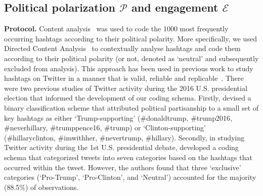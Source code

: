 \subsection{Political polarization $\mathcal{P}$ and engagement $\mathcal{E}$}
\label{subsec:political-polarization-measures}




\textbf{Protocol.}
Content analysis~\cite{kimkuljis2010} was used to code the 1000 most frequently occurring hashtags according to their political polarity. More specifically, we used 
Directed Content Analysis~\cite{hsieh-shannon-2005} to contextually analyse hashtags and code them according to their political polarity (or not, denoted as `neutral' and subsequently excluded from analysis). 
This approach has been used in previous work to study hashtags on Twitter in a manner that is valid, reliable and replicable~\cite{small-2011}. 
There were two previous studies of Twitter activity during the 2016 U.S. presidential election that informed the development of our coding schema. 
Firstly, \citet{FM7090} devised a binary classification scheme that attributed political partisanship to a small set of key hashtags as either `Trump-supporting' (\#donaldtrump, \#trump2016, \#neverhillary, \#trumppence16, \#trump) or `Clinton-supporting' (\#hillaryclinton, \#imwithher, \#nevertrump, \#hillary). 
Secondly, in studying Twitter activity during the 1st U.S. presidential debate, \citet{Kollanyi.2016.presidentialdebate} developed a coding schema that categorized tweets into seven categories based on the hashtags that occurred within the tweet. 
However, the authors found that three `exclusive' categories (`Pro-Trump', `Pro-Clinton', and `Neutral') accounted for the majority (88.5\%) of observations. 


